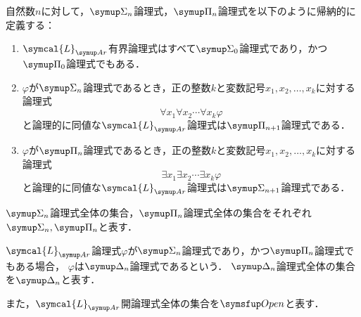 \begin{Def}
	自然数\(n\)に対して，\(\SigmaFormula_n\)論理式，\(\PiFormula_n\)論理式を以下のように帰納的に定義する：
	\begin{enumerate}
		\item \(\symcal{L}_{\Ar}\)有界論理式はすべて\(\SigmaFormula_0\)論理式であり，かつ\(\PiFormula_0\)論理式でもある．
		\item \(\varphi\)が\(\SigmaFormula_n\)論理式であるとき，正の整数\(k\)と変数記号\(x_1, x_2, \dots, x_k\)に対する論理式
		      \[
			      \forall x_1 \forall x_2 \dotsb \forall x_k \varphi
		      \]
		      と論理的に同値な\(\symcal{L}_{\Ar}\)論理式は\(\PiFormula_{n+1}\)論理式である．
		\item \(\varphi\)が\(\PiFormula_n\)論理式であるとき，正の整数\(k\)と変数記号\(x_1, x_2, \dots, x_k\)に対する論理式
		      \[
			      \exists x_1 \exists x_2 \dotsb \exists x_k \varphi
		      \]
		      と論理的に同値な\(\symcal{L}_{\Ar}\)論理式は\(\SigmaFormula_{n+1}\)論理式である．
	\end{enumerate}
	\(\SigmaFormula_n\)論理式全体の集合，\(\PiFormula_n\)論理式全体の集合をそれぞれ\(\SigmaFormula_n, \PiFormula_n\)と表す．

	\(\symcal{L}_{\Ar}\)論理式\(\varphi\)が\(\SigmaFormula_n\)論理式であり，かつ\(\PiFormula_n\)論理式でもある場合，
	\(\varphi\)は\(\DeltaFormula_n\)論理式であるという．
	\(\DeltaFormula_n\)論理式全体の集合を\(\DeltaFormula_n\)と表す．

	また，\(\symcal{L}_{\Ar}\)開論理式全体の集合を\(\OpenFormulaSet\)と表す．
\end{Def}


